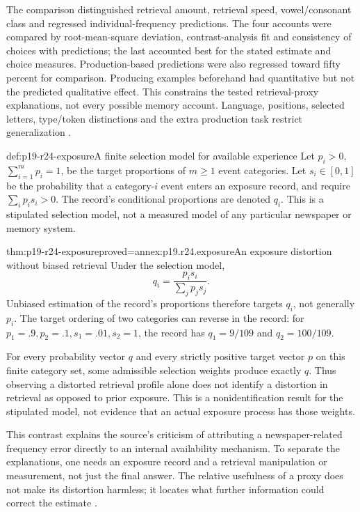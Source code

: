 The comparison distinguished retrieval amount, retrieval speed,
vowel/consonant class and regressed individual-frequency
predictions. The four accounts were compared by root-mean-square
deviation, contrast-analysis fit and consistency of choices with
predictions; the last accounted best for the stated estimate and
choice measures. Production-based predictions were also regressed
toward fifty percent for comparison. Producing examples beforehand had quantitative
but not the predicted qualitative effect. This constrains the
tested retrieval-proxy explanations, not every possible memory
account. Language, positions, selected letters, type/token
distinctions and the extra production task restrict generalization
\cite[pp.~759--762,765--767]{SedlmeierHertwigGigerenzer1998Letters}.

\begin{hbdefinition}{def:p19-r24-exposure}{A finite selection model for available experience}
Let \(p_i>0\), \(\sum_{i=1}^m p_i=1\), be the target proportions
of \(m\geq1\) event categories. Let \(s_i\in[0,1]\) be the
probability that a category-\(i\) event enters an exposure record, and
require \(\sum_i p_i s_i>0\). The record's conditional proportions
are denoted \(q_i\). This is a stipulated selection model, not a
measured model of any particular newspaper or memory system.
\end{hbdefinition}

\begin{hbtheorem}{thm:p19-r24-exposure}{proved=annex:p19.r24.exposure}{An exposure distortion without biased retrieval}
Under the selection model,
\[
 q_i=\frac{p_i s_i}{\sum_j p_j s_j}.
\]
Unbiased estimation of the record's proportions therefore targets
\(q_i\), not generally \(p_i\). The target ordering of two categories
can reverse in the record: for
\(p_1=.9,p_2=.1,s_1=.01,s_2=1\), the record has
\(q_1=9/109\) and \(q_2=100/109\).

For every probability vector \(q\) and every strictly positive target
vector \(p\) on this finite category set, some admissible selection
weights produce exactly \(q\). Thus observing a distorted retrieval
profile alone does not identify a distortion in retrieval as opposed
to prior exposure. This is a nonidentification result for the stipulated
model, not evidence that an actual exposure process has those weights.
\end{hbtheorem}

This contrast explains the source's criticism of attributing a
newspaper-related frequency error directly to an internal availability
mechanism. To separate the explanations, one needs an exposure record
and a retrieval manipulation or measurement, not just the final answer.
The relative usefulness of a proxy does not make its distortion harmless;
it locates what further information could correct the estimate
\cite[pp.~159--163]{FiedlerPragerMcCaughey2021Heuristics}.

